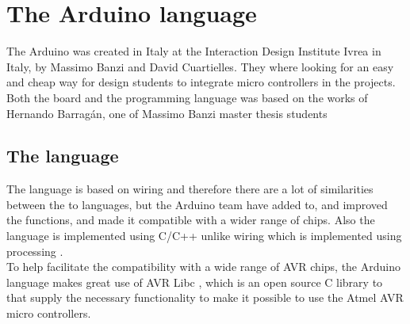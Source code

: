 \section{The Arduino language}
The Arduino was created in Italy at the Interaction Design Institute Ivrea in Italy, by Massimo Banzi and David Cuartielles. They where looking for an easy and cheap way for design students to integrate micro controllers in the projects\cite{arduino:hist}. Both the board and the programming language was based on the works of Hernando Barragán, one of Massimo Banzi master thesis students \cite{Wiring:thesis}

\subsection{The language}
The language is based on wiring and therefore there are a lot of similarities between the to languages, but the Arduino team have added to, and improved the functions, and made it compatible with a wider range of chips. Also the language is implemented using C/C++ unlike wiring which is implemented using processing \cite{Wiring:thesis}.\\
To help facilitate the compatibility with a wide range of AVR chips, the Arduino language makes great use of AVR Libc \cite{AVR:lib}, which is an open source C library to that supply the necessary functionality to make it possible to use the Atmel AVR micro controllers. 